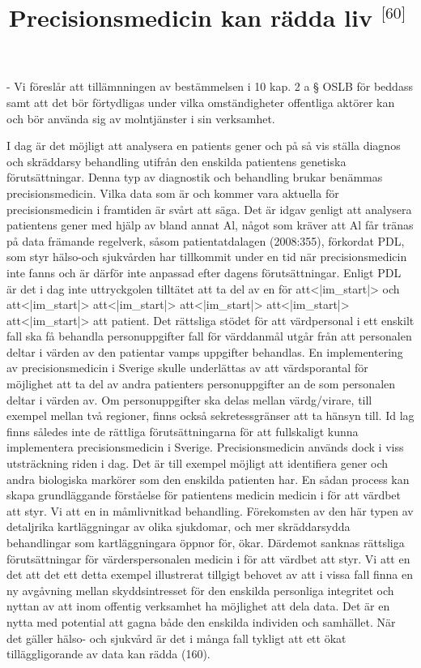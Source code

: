 {{{{{{{{- Vi föreslår att tillämnningen av bestämmelsen i 10 kap. 2 a § OSLB för beddass samt att det bör förtydligas under vilka omständigheter offentliga aktörer kan och bör använda sig av molntjänster i sin verksamhet. \({ }^{}\)

\title{
Precisionsmedicin kan rädda liv \({ }^{\text {[60] }}\)
}
I dag är det möjligt att analysera en patients gener och på så vis ställa diagnos och skräddarsy behandling utifrån den enskilda patientens genetiska förutsättningar. Denna typ av diagnostik och behandling brukar benämmas precisionsmedicin. Vilka data som är och kommer vara aktuella för precisionsmedicin i framtiden är svårt att säga. Det är idgav genligt att analysera patientens gener med hjälp av bland annat \(\mathrm{Al}\), något som kräver att \(\mathrm{Al}\) får tränas på data främande regelverk, såsom patientatdalagen (2008:355), förkordat PDL, som styr hälso-och sjukvården har tillkommit under en tid när precisionsmedicin inte fanns och är därför inte anpassad efter dagens förutsättningar. Enligt PDL är det i dag inte uttryckgolen tilltätet att ta del av en för att<|im_start|> och att<|im_start|> att<|im_start|> att<|im_start|> att<|im_start|> att<|im_start|> att patient. Det rättsliga stödet för att värdpersonal i ett enskilt fall ska få behandla personuppgifter fall för värddanmål utgår från att personalen deltar i värden av den patientar vamps uppgifter behandlas. En implementering av precisionsmedicin i Sverige skulle underlättas av att värdsporantal för möjlighet att ta del av andra patienters personuppgifter an de som personalen deltar i värden av.
Om personuppgifter ska delas mellan värdg/virare, till exempel mellan två regioner, finns också sekretessgränser att ta hänsyn till. Id lag finns således inte de rättliga förutsättningarna för att fullskaligt kunna implementera precisionsmedicin i Sverige. Precisionsmedicin används dock i viss utsträckning riden i dag. Det är till exempel möjligt att identifiera gener och andra biologiska markörer som den enskilda patienten har. En sådan process kan skapa grundläggande förståelse för patientens medicin medicin i för att värdbet att styr. Vi att en in måmlivnitkad behandling. Förekomsten av den här typen av detaljrika kartläggningar av olika sjukdomar, och mer skräddarsydda behandlingar som kartläggningara öppnor för, ökar. Därdemot sanknas rättsliga förutsättningar för värderspersonalen medicin i för att värdbet att styr. Vi att en det att det ett detta exempel illustrerat tillgigt behovet av att i vissa fall finna en ny avgåvning mellan skyddsintresset för den enskilda personliga integritet och nyttan av att inom offentig verksamhet ha möjlighet att dela data. Det är en nytta med potential att gagna både den enskilda individen och samhället. När det gäller hälso- och sjukvård är det i många fall tykligt att ett ökat tilläggligorande av data kan rädda (160).

}}}}}}}}
